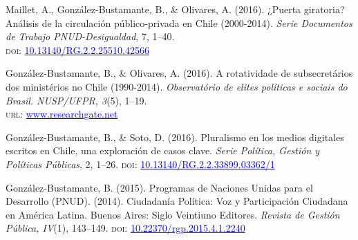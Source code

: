 \begin{publications}

\begin{benumerate}{4}

\item{\small Maillet, A., Gonz\'alez-Bustamante, B., \& Olivares, A. (2016). ¿Puerta giratoria? Análisis de la circulación público-privada en Chile (2000-2014). {\itshape Serie Documentos de Trabajo PNUD-Desigualdad}, 7, 1--40. \\ {\scshape doi}: \href{http://doi.org/10.13140/RG.2.2.25510.42566}{\textcolor{blue}{10.13140/RG.2.2.25510.42566}}}\vspace{1mm}

\item{\small Gonz\'alez-Bustamante, B., \& Olivares, A. (2016). A rotatividade de subsecretários dos ministérios no Chile (1990-2014). {\itshape Observat\'orio de elites pol\'iticas e sociais do Brasil. NUSP/UFPR, 3}(5), 1--19. \\ {\scshape url}: \href{https://www.researchgate.net/publication/321993740_A_rotatividade_de_subsecretarios_dos_ministerios_no_Chile_1990-2014}{\textcolor{blue}{www.researchgate.net}}}\vspace{1mm}

\item{\small Gonz\'alez-Bustamante, B., \& Soto, D. (2016). Pluralismo en los medios digitales escritos en Chile, una exploración de casos clave. {\itshape Serie Pol\'itica, Gesti\'on y Pol\'iticas P\'ublicas}, 2, 1--26. {\scshape doi}: \href{http://doi.org/10.13140/RG.2.2.33899.03362/1}{\textcolor{blue}{10.13140/RG.2.2.33899.03362/1}}}\vspace{1mm}

\item{\small Gonz\'alez-Bustamante, B. (2015). Programas de Naciones Unidas para el Desarrollo (PNUD). (2014). Ciudadanía Política: Voz y Participación Ciudadana en América Latina. Buenos Aires: Siglo Veintiuno Editores. {\itshape Revista de Gestión Pública, IV}(1), 143--149. {\scshape doi}: \href{https://doi.org/10.22370/rgp.2015.4.1.2240}{\textcolor{blue}{10.22370/rgp.2015.4.1.2240}}}

\end{benumerate}

\end{publications}
